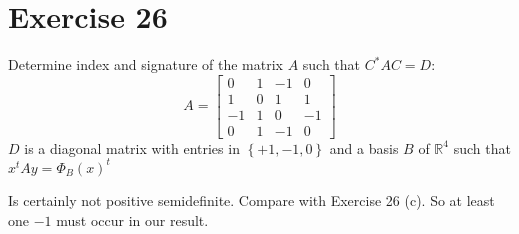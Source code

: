 \documentclass[a4paper]{article}
\theoremstyle{definition}
\newcommand\set[1]{\left\{#1\right\}}
\begin{document}
\section{Exercise 26}
\begin{ex}
  Determine index and signature of the matrix $A$ such that $C^* A C = D$:
  \[
    A = \begin{bmatrix}
      0 & 1 & -1 & 0 \\
      1 & 0 & 1 & 1 \\
      -1 & 1 & 0 & -1 \\
      0 & 1 & -1 & 0
    \end{bmatrix}
  \]
  $D$ is a diagonal matrix with entries in $\set{+1,-1,0}$ and a basis $B$ of $\mathbb R^4$
  such that $x^t A y = \Phi_B(x)^t$
\end{ex}

Is certainly not positive semidefinite. Compare with Exercise 26 (c).
So at least one $-1$ must occur in our result.
\end{document}
